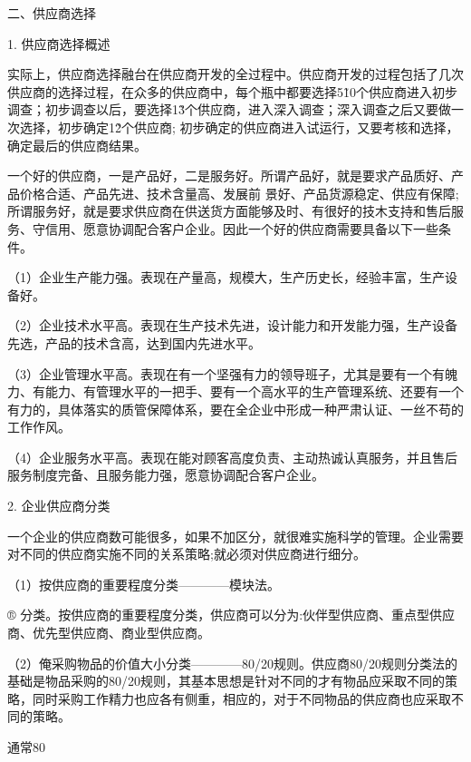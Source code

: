二、供应商选择

    1. 供应商选择概述

    实际上，供应商选择融台在供应商开发的全过程中。供应商开发的过程包括了几次供应商的选择过程，在众多的供应商中，每个瓶中都要选择5\~10个供应商进入初步调查；初步调查以后，要选择1\~3个供应商，进入深入调查；深入调查之后又要做一次选择，初步确定1\~2个供应商; 初步确定的供应商进入试运行，又要考核和选择，确定最后的供应商结果。

    一个好的供应商，一是产品好，二是服务好。所谓产品好，就是要求产品质好、产品价格合适、产品先进、技术含量高、发展前 景好、产品货源稳定、供应有保障; 所谓服务好，就是要求供应商在供送货方面能够及时、有很好的技木支持和售后服务、守信用、愿意协调配合客户企业。因此一个好的供应商需要具备以下一些条件。

    （1）企业生产能力强。表现在产量高，规模大，生产历史长，经验丰富，生产设备好。

    （2）企业技术水平高。表现在生产技术先进，设计能力和开发能力强，生产设备先选，产品的技术含高，达到国内先进水平。

    （3）企业管理水平高。表现在有一个坚强有力的领导班子，尤其是要有一个有魄力、有能力、有管理水平的一把手、要有一个高水平的生产管理系统、还要有一个有力的，具体落实的质管保障体系，要在全企业中形成一种严肃认证、一丝不苟的工作作风。

    （4）企业服务水平高。表现在能对顾客高度负责、主动热诚认真服务，并且售后服务制度完备、且服务能力强，愿意协调配合客户企业。

    2. 企业供应商分类

    一个企业的供应商数可能很多，如果不加区分，就很难实施科学的管理。企业需要对不同的供应商实施不同的关系策略;就必须对供应商进行细分。

    （1）按供应商的重要程度分类————模块法。

    ® 分类。按供应商的重要程度分类，供应商可以分为:伙伴型供应商、重点型供应商、优先型供应商、商业型供应商。

    （2）俺采购物品的价值大小分类————80/20规则。供应商80/20规则分类法的基础是物品采购的80/20规则，其基本思想是针对不同的才有物品应采取不同的策略，同时采购工作精力也应各有侧重，相应的，对于不同物品的供应商也应采取不同的策略。

    通常80%

